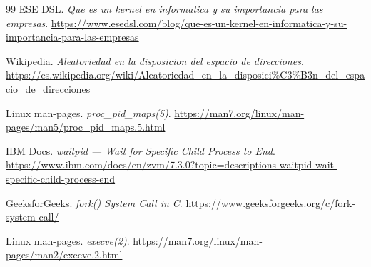 \documentclass[10pt,a4paper]{article}
\begin{document}
\begin{thebibliography}{99}
ESE DSL. \textit{Que es un kernel en informatica y su importancia para las empresas}.
\url{https://www.esedsl.com/blog/que-es-un-kernel-en-informatica-y-su-importancia-para-las-empresas}

Wikipedia. \textit{Aleatoriedad en la disposicion del espacio de direcciones}.
\url{https://es.wikipedia.org/wiki/Aleatoriedad_en_la_disposici\%C3\%B3n_del_espacio_de_direcciones}

Linux man-pages. \textit{proc\_pid\_maps(5)}.
\url{https://man7.org/linux/man-pages/man5/proc_pid_maps.5.html}

IBM Docs. \textit{waitpid --- Wait for Specific Child Process to End}.
\url{https://www.ibm.com/docs/en/zvm/7.3.0?topic=descriptions-waitpid-wait-specific-child-process-end}

GeeksforGeeks. \textit{fork() System Call in C}.
\url{https://www.geeksforgeeks.org/c/fork-system-call/}

Linux man-pages. \textit{execve(2)}.
\url{https://man7.org/linux/man-pages/man2/execve.2.html}

\end{thebibliography}
\end{document}
